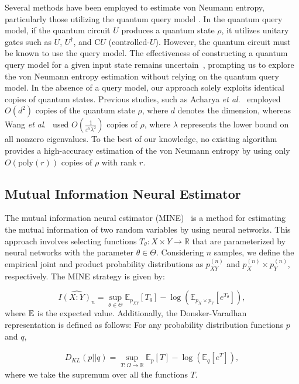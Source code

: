 \documentclass[aps,groupedaddress,superscriptaddress,amssymb,amsmath,amsbsy,amsfonts,twocolumn,pra]{revtex4}
\begin{document}
Several methods have been employed to estimate von Neumann entropy, particularly those utilizing the quantum query model \cite{WZW22,GL19,SH21}. In the quantum query model, if the quantum circuit $U$ produces a quantum state $\rho$, it utilizes unitary gates such as $U$, $U^{\dagger}$, and C$U$ (controlled-$U$). However, the quantum circuit must be known to use the query model. The effectiveness of constructing a quantum query model for a given input state remains uncertain~\cite{WZW22}, prompting us to explore the von Neumann entropy estimation without relying on the quantum query model. In the absence of a query model, our approach solely exploits identical copies of quantum states. Previous studies, such as Acharya \emph{et al}.~\cite{AISW20} employed $O(d^2)$ copies of the quantum state $\rho$, where $d$ denotes the dimension, whereas Wang \emph{et al}.~\cite{WZW22} used $O\left(\frac{1}{\varepsilon^{5}\lambda^{2}}\right)$ copies of $\rho$, where $\lambda$ represents the lower bound on all nonzero eigenvalues. To the best of our knowledge, no existing algorithm provides a high-accuracy estimation of the von Neumann entropy by using only $O(\text{poly}(r))$ copies of $\rho$ with rank $r$.

\subsection{Mutual Information Neural Estimator}
The mutual information neural estimator (MINE)~\cite{BBR+18} is a method for estimating the mutual information of two random variables by using neural networks. This approach involves selecting functions $T_{\theta}: X \times Y \rightarrow \mathbb{R}$ that are parameterized by neural networks with the parameter $\theta \in \Theta$. Considering $n$ samples, we define the empirical joint and product probability distributions as $p_{XY}^{(n)}$ and $p_X^{(n)} \times p_Y^{(n)}$, respectively. The MINE strategy is given by:

\begin{equation} \label{eq:nim}
\widehat{I(X:Y)_n} = \sup_{\theta \in \Theta} \mathbb{E}_{p_{XY}}\left[T_{\theta}\right]-\log\left(\mathbb{E}_{p_X \times p_Y}\left[e^{T_{\theta}}\right]\right),
\end{equation} 
where ${\mathbb{E}}$ is the expected value. Additionally, the Donsker-Varadhan representation is defined as follows: For any probability distribution functions $p$ and $q$,

\begin{align}
D_{KL}(p||q) = \sup_{T: \Omega \rightarrow \mathbb{R}} \mathbb{E}_p[T]-\log\left(\mathbb{E}_q\left[e^T\right]\right),
\end{align}
where we take the supremum over all the functions $T$.
\end{document}

